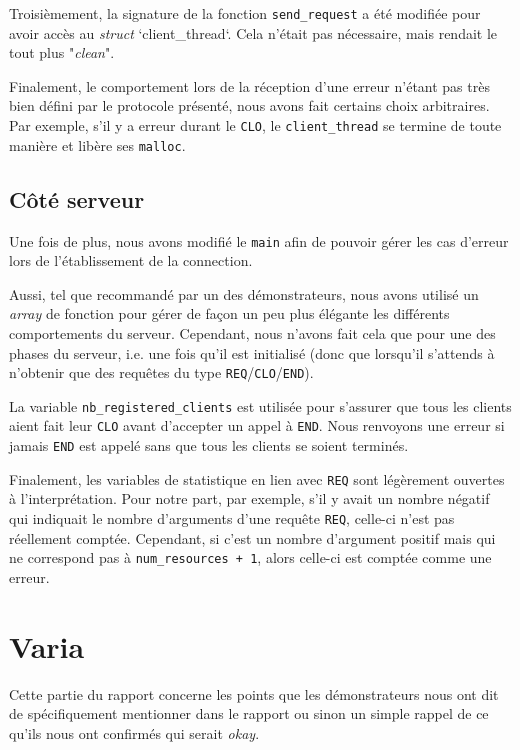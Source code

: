 \documentclass[11pt]{article}
\begin{document}
Troisièmement, la signature de la fonction \texttt{send\_request} a été modifiée pour avoir accès au \textit{struct} `client\_thread`. Cela n'était pas nécessaire, mais rendait le tout plus "\textit{clean}".

Finalement, le comportement lors de la réception d'une erreur n'étant pas très bien défini par le protocole présenté, nous avons fait certains choix arbitraires. Par exemple, s'il y a erreur durant le \texttt{CLO}, le \texttt{client\_thread} se termine de toute manière et libère ses \texttt{malloc}.

\subsection{Côté serveur}

Une fois de plus, nous avons modifié le \texttt{main} afin de pouvoir gérer les cas d'erreur lors de l'établissement de la connection.

Aussi, tel que recommandé par un des démonstrateurs, nous avons utilisé un \textit{array} de fonction pour gérer de façon un peu plus élégante les différents comportements du serveur. Cependant, nous n'avons fait cela que pour une des phases du serveur, i.e. une fois qu'il est initialisé (donc que lorsqu'il s'attends à n'obtenir que des requêtes du type \texttt{REQ}/\texttt{CLO}/\texttt{END}).

La variable \texttt{nb\_registered\_clients} est utilisée pour s'assurer que tous les clients aient fait leur \texttt{CLO} avant d'accepter un appel à \texttt{END}. Nous renvoyons une erreur si jamais \texttt{END} est appelé sans que tous les clients se soient terminés.

Finalement, les variables de statistique en lien avec \texttt{REQ} sont légèrement ouvertes à l'interprétation. Pour notre part, par exemple, s'il y avait un nombre négatif qui indiquait le nombre d'arguments d'une requête \texttt{REQ}, celle-ci n'est pas réellement comptée. Cependant, si c'est un nombre d'argument positif mais qui ne correspond pas à \texttt{num\_resources + 1}, alors celle-ci est comptée comme une erreur.


\section{Varia}

Cette partie du rapport concerne les points que les démonstrateurs nous ont dit de spécifiquement mentionner dans le rapport ou sinon un simple rappel de ce qu'ils nous ont confirmés qui serait \textit{okay}.
\end{document}
